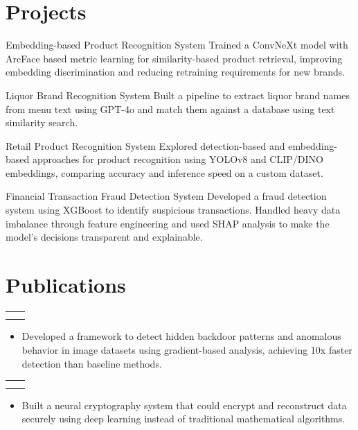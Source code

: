 \documentclass[a4paper,11pt]{article}
\makeatletter
\newcommand{\resumeProjectP}[3]{
\vspace{2 mm}
    \begin{tabular*}{0.98\textwidth}[t]{l@{\extracolsep{\fill}}r}
        \text{#1} & \text{\footnotesize{#2}} \\
        \large{#3}
    \end{tabular*}
    \vspace{-7 mm}
}
\newcommand{\resumeItemListStart}{\begin{justify}\begin{itemize}[leftmargin=3ex, rightmargin=2ex, noitemsep,labelsep=1.2mm,itemsep=0mm]\small}
\newcommand{\resumeItemListEnd}{\end{itemize}\end{justify}\vspace{-1mm}}
\makeatother
\begin{document}
\section{\textbf{Projects}}
\vspace{2mm}
\begin{itemize}[leftmargin=0.15in]

\resumeProjectNoItemNoDate
{Embedding-based Product Recognition System}
{Trained a ConvNeXt model with ArcFace based metric learning for similarity-based product retrieval, improving embedding discrimination and reducing retraining requirements for new brands.}

\resumeProjectNoItemNoDate
{Liquor Brand Recognition System}
{Built a pipeline to extract liquor brand names from menu text using GPT-4o and match them against a database using text similarity search.}

\resumeProjectNoItemNoDate
{Retail Product Recognition System}
{Explored detection-based and embedding-based approaches for product recognition using YOLOv8 and CLIP/DINO embeddings, comparing accuracy and inference speed on a custom dataset.}

\resumeProjectNoItemNoDate
{Financial Transaction Fraud Detection System}
{Developed a fraud detection system using XGBoost to identify suspicious transactions. Handled heavy data imbalance through feature engineering and used SHAP analysis to make the model's decisions transparent and explainable.}
\end{itemize}


\section{\textbf{Publications}}
\resumeProjectP
{TraceNet: Backdoor Detection in Deep Neural Networks}
{IEEE ICDSINC, NIT Raipur, 2025}{}
\resumeItemListStart
\item{Developed a framework to detect hidden backdoor patterns and anomalous behavior in image datasets using gradient-based analysis, achieving 10x faster detection than baseline methods.}
\resumeItemListEnd
\vspace{-2mm}

\resumeProjectP
{Adversarial Neural Cryptography: Security Challenges and Solutions}
{ICMC, IIT Bhilai, 2025}{}
\resumeItemListStart
\item{Built a neural cryptography system that could encrypt and reconstruct data securely using deep learning instead of traditional mathematical algorithms.}
\resumeItemListEnd
  
\end{document}
